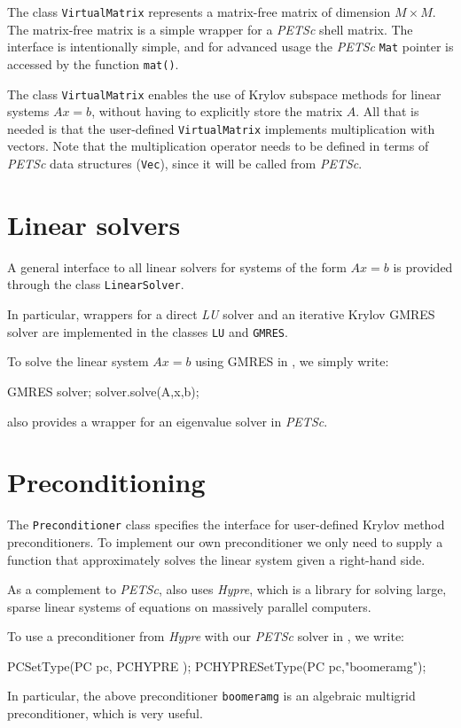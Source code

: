 The \dolfin{} class \texttt{VirtualMatrix} represents a matrix-free 
matrix of dimension $M\times M$. 
The matrix-free matrix is a simple wrapper for a {\em PETSc} shell matrix. 
The interface is intentionally simple, and for advanced usage the 
{\em PETSc} \texttt{Mat} pointer is accessed by the function \texttt{mat()}.  

The class \texttt{VirtualMatrix} enables the use of Krylov subspace
methods for linear systems $Ax = b$, without having to explicitly
store the matrix $A$. All that is needed is that the user-defined
\texttt{VirtualMatrix} implements multiplication with vectors. 
Note that the multiplication operator needs to be defined in terms of
{\em PETSc} data structures (\texttt{Vec}), since it will be called from {\em PETSc}.

\section{Linear solvers}

A general interface to all linear solvers for systems of the form 
$Ax=b$ is provided through the class \texttt{LinearSolver}. 

In particular, wrappers for a direct {\em LU} solver and an iterative 
Krylov GMRES solver are implemented in the classes \texttt{LU} and \texttt{GMRES}. 

To solve the linear system $Ax=b$ using GMRES in \dolfin{}, we simply write:  

\begin{code} 
GMRES solver; 
solver.solve(A,x,b);
\end{code} 

\dolfin{} also provides a wrapper for an eigenvalue solver in {\em PETSc}. 

\section{Preconditioning}

The \texttt{Preconditioner} class specifies the interface for user-defined 
Krylov method preconditioners. To implement our own preconditioner we only 
need to supply a function that approximately solves the linear system given 
a right-hand side.

As a complement to {\em PETSc}, \dolfin{} also uses {\em Hypre}, which is a 
library for solving large, sparse linear systems of equations on 
massively parallel computers. 

To use a preconditioner from {\em Hypre} with our {\em PETSc} solver in \dolfin{}, we write:  
\begin{code}
PCSetType(PC pc, PCHYPRE );
PCHYPRESetType(PC pc,"boomeramg");
\end{code}

In particular, the above preconditioner \texttt{boomeramg} is an algebraic multigrid 
preconditioner, which is very useful. 

